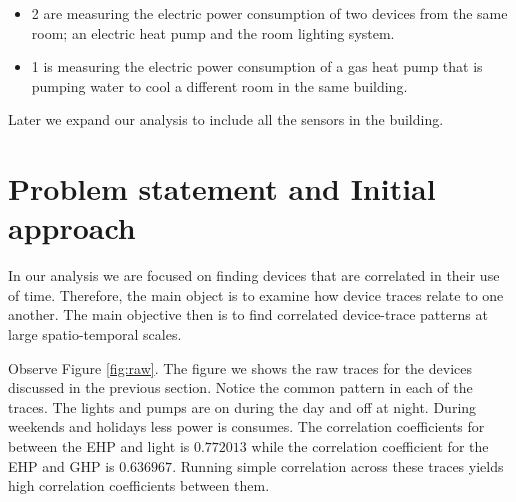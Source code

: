 \begin{itemize}
 \item 2 are measuring the electric power consumption of two devices from the same room; an electric heat 
 		pump and the room lighting system.
 \item 1 is measuring the electric power consumption of a gas heat pump that is pumping water to cool 
 		a different room in the same building.
\end{itemize}

Later we expand our analysis to include all the sensors in the building.

\section{Problem statement and Initial approach}\label{problem}
In our analysis we are focused on finding devices that are correlated in their use of time.  Therefore, the
main object is to examine how device traces relate to one another.  The main objective then is to find
correlated device-trace patterns at large spatio-temporal scales.  

Observe Figure \ref{fig:raw}.  The figure we shows the raw traces for the devices discussed in the previous section.
Notice the common pattern in each of the traces.  The lights and pumps are on during the day and off at night.
During weekends and holidays less power is consumes.  The correlation coefficients for 
between  the EHP and light is $0.772013$ while the  correlation coefficient for the EHP and GHP is $0.636967$.
Running simple correlation across these traces yields high correlation coefficients between them.



